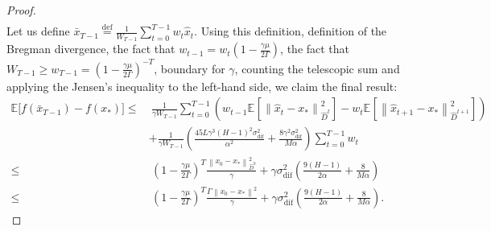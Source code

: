 \documentclass[sn-mathphys,Numbered]{sn-jnl}%
\newcommand*{\E}{{\mathbb E}}
\renewcommand{\|}{\parallel}
\newcommand\ec[2][]{\ensuremath{\mathbb{E}_{#1} \left[#2\right]}}
\newcommand\ecn[3][]{\ec[#1]{\norm{#2}^2_{#3}}}
\newcommand\br[1]{\left ( #1 \right )}
\newcommand{\norm}[1]{\left\lVert#1\right\rVert}
\newcommand{\sqn}[1]{{\left\lVert#1\right\rVert}^2}
\newcommand{\eqdef}{\overset{\text{def}}{=}}
\newcommand{\sigmaf}{\sigma_{\mathrm{dif}}}
\renewcommand {\*} {\ast}
\begin{document}
\begin{proof}
\begin{align*}
    \end{align*}
    Let us define $\bar{x}_{T-1} \eqdef \frac{1}{W_{T-1}}\sum\limits_{t=0}^{T-1}w_t \hat{x}_t$. Using this definition, definition of the Bregman divergence, the fact that $w_{t-1} = w_t\br{1 - \frac{\gamma \mu}{2\Gamma}}$, the fact that $W_{T-1} \geq w_{T-1} = \br{1 - \frac{\gamma \mu}{2\Gamma}}^{-T}$, boundary for $\gamma$, counting the telescopic sum and applying the Jensen's inequality to the left-hand side, we claim the final result:
    \begin{align*}
        \E\big[f(\bar{x}_{T-1}) - f(x_\ast)\big] \leq&\ \frac{1}{\gamma W_{T-1}}\sum_{t=0}^{T-1} \left(w_{t-1}\ecn{\hat{x}_{t} - x_\ast}{\hat{D}^{t}} - w_t \ecn{\hat{x}_{t+1} - x_\ast}{\hat{D}^{t+1}}\right) \\ &+ \frac{1}{\gamma W_{T-1}}\br{\frac{45 L \gamma^3(H-1)^2 \sigmaf^2}{\alpha^2}  + \frac{8 \gamma^2 \sigmaf^2}{M\alpha}}\sum_{t=0}^{T-1} w_t \\ \leq&\ \br{1 - \frac{\gamma \mu}{2\Gamma}}^T\frac{\sqn{x_{0} - x_\ast}_{\hat{D}^0}}{\gamma} + \gamma\sigmaf^2\br{\frac{9 (H-1) }{2\alpha}  + \frac{8}{M\alpha}} \\ \leq&\ \br{1 - \frac{\gamma \mu}{2\Gamma}}^T\frac{\Gamma\sqn{x_{0} - x_\ast}}{\gamma} + \gamma\sigmaf^2\br{\frac{9 (H-1) }{2\alpha}  + \frac{8}{M\alpha}}. 
    \end{align*}
\end{proof}
\end{document}
